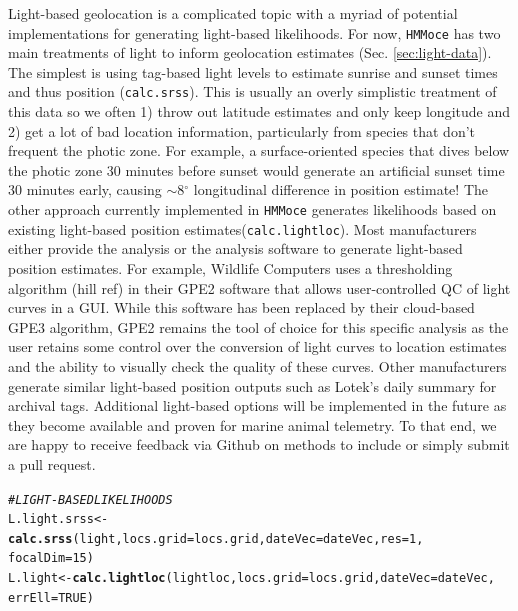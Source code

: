 \documentclass{article}\usepackage[]{graphicx}\usepackage[]{color}
\makeatletter
\newcommand{\hlnum}[1]{\textcolor[rgb]{0.686,0.059,0.569}{#1}}%
\newcommand{\hlcom}[1]{\textcolor[rgb]{0.678,0.584,0.686}{\textit{#1}}}%
\newcommand{\hlstd}[1]{\textcolor[rgb]{0.345,0.345,0.345}{#1}}%
\newcommand{\hlkwb}[1]{\textcolor[rgb]{0.69,0.353,0.396}{#1}}%
\newcommand{\hlkwc}[1]{\textcolor[rgb]{0.333,0.667,0.333}{#1}}%
\newcommand{\hlkwd}[1]{\textcolor[rgb]{0.737,0.353,0.396}{\textbf{#1}}}%
\newenvironment{kframe}{%
 \def\at@end@of@kframe{}%
 \ifinner\ifhmode%
  \def\at@end@of@kframe{\end{minipage}}%
  \begin{minipage}{\columnwidth}%
 \fi\fi%
 \def\FrameCommand##1{\hskip\@totalleftmargin \hskip-\fboxsep
 \colorbox{shadecolor}{##1}\hskip-\fboxsep
     \hskip-\linewidth \hskip-\@totalleftmargin \hskip\columnwidth}%
 \MakeFramed {\advance\hsize-\width
   \@totalleftmargin\z@ \linewidth\hsize
   \@setminipage}}%
 {\par\unskip\endMakeFramed%
 \at@end@of@kframe}
\newenvironment{knitrout}{}{} %
\makeatother
\begin{document}
Light-based geolocation is a complicated topic with a myriad of potential implementations for generating light-based likelihoods. For now, \texttt{HMMoce} has two main treatments of light to inform geolocation estimates (Sec. \ref{sec:light-data}). The simplest is using tag-based light levels to estimate sunrise and sunset times and thus position (\texttt{calc.srss}). This is usually an overly simplistic treatment of this data so we often 1) throw out latitude estimates and only keep longitude and 2) get a lot of bad location information, particularly from species that don't frequent the photic zone. For example, a surface-oriented species that dives below the photic zone 30 minutes before sunset would generate an artificial sunset time 30 minutes early, causing $\sim$8$^\circ$ longitudinal difference in position estimate! The other approach currently implemented in \texttt{HMMoce} generates likelihoods based on existing light-based position estimates(\texttt{calc.lightloc}). Most manufacturers either provide the analysis or the analysis software to generate light-based position estimates. For example, Wildlife Computers uses a thresholding algorithm (hill ref) in their GPE2 software that allows user-controlled QC of light curves in a GUI. While this software has been replaced by their cloud-based GPE3 algorithm, GPE2 remains the tool of choice for this specific analysis as the user retains some control over the conversion of light curves to location estimates and the ability to visually check the quality of these curves. Other manufacturers generate similar light-based position outputs such as Lotek's daily summary for archival tags. Additional light-based options will be implemented in the future as they become available and proven for marine animal telemetry. To that end, we are happy to receive feedback via Github on methods to include or simply submit a pull request.

\begin{knitrout}\small
{}\color{fgcolor}\begin{kframe}
\begin{alltt}
\hlcom{# LIGHT-BASED LIKELIHOODS}
\hlstd{L.light.srss} \hlkwb{<-} \hlkwd{calc.srss}\hlstd{(light,} \hlkwc{locs.grid} \hlstd{= locs.grid,} \hlkwc{dateVec} \hlstd{= dateVec,} \hlkwc{res} \hlstd{=} \hlnum{1}\hlstd{,}
    \hlkwc{focalDim} \hlstd{=} \hlnum{15}\hlstd{)}
\hlstd{L.light} \hlkwb{<-} \hlkwd{calc.lightloc}\hlstd{(lightloc,} \hlkwc{locs.grid} \hlstd{= locs.grid,} \hlkwc{dateVec} \hlstd{= dateVec,}
    \hlkwc{errEll} \hlstd{=} \hlnum{TRUE}\hlstd{)}
\end{alltt}
\end{kframe}
\end{knitrout}
\end{document}

